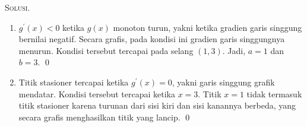 \documentclass{exam}
\renewenvironment{proof}[1][Solusi.]{\ProofBox\strut\textsc{#1}\space}{\endProofBox}
\numberwithin{equation}{section}
\begin{document}
\begin{enumerate}
\begin{proof}
{\begin{tikzpicture}[x=0.75pt,y=0.75pt,yscale=-1,xscale=1]
\end{tikzpicture}
    \par}

    \begin{enumerate}[label=(\alph*)]
        \item $g^\prime(x) < 0$ ketika $g(x)$ monoton turun, yakni ketika gradien garis singgung bernilai negatif. Secara grafis, pada kondisi ini gradien garis singgungnya menurun. Kondisi tersebut tercapai pada selang $(1,3)$. Jadi, $a = 1$ dan $b = 3$. \qed
        \item Titik stasioner tercapai ketika $g^\prime(x) = 0$, yakni garis singgung grafik mendatar. Kondisi tersebut tercapai ketika $x = 3$. Titik $x = 1$ tidak termasuk titik stasioner karena turunan dari sisi kiri dan sisi kanannya berbeda, yang secara grafis menghasilkan titik yang lancip. \qed
    \end{enumerate}
\end{proof}\vspace{1em}
\end{enumerate}


\pagebreak
\end{document}
